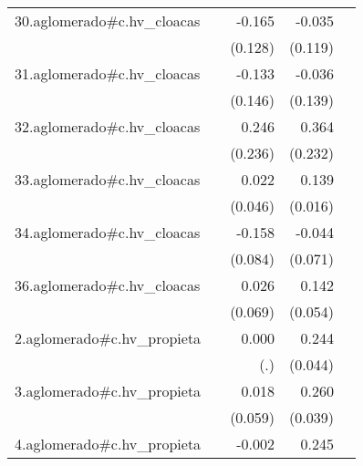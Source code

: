 {\begin{longtable}{l*{4}{D{.}{.}{-1}}}
\addlinespace
30.aglomerado#c.hv\_cloacas&                     &      -0.165         &      -0.035         &                     \\
            &                     &     (0.128)         &     (0.119)         &                     \\
\addlinespace
31.aglomerado#c.hv\_cloacas&                     &      -0.133         &      -0.036         &                     \\
            &                     &     (0.146)         &     (0.139)         &                     \\
\addlinespace
32.aglomerado#c.hv\_cloacas&                     &       0.246         &       0.364         &                     \\
            &                     &     (0.236)         &     (0.232)         &                     \\
\addlinespace
33.aglomerado#c.hv\_cloacas&                     &       0.022         &       0.139\sym{***}&                     \\
            &                     &     (0.046)         &     (0.016)         &                     \\
\addlinespace
34.aglomerado#c.hv\_cloacas&                     &      -0.158         &      -0.044         &                     \\
            &                     &     (0.084)         &     (0.071)         &                     \\
\addlinespace
36.aglomerado#c.hv\_cloacas&                     &       0.026         &       0.142\sym{**} &                     \\
            &                     &     (0.069)         &     (0.054)         &                     \\
\addlinespace
2.aglomerado#c.hv\_propieta&                     &       0.000         &       0.244\sym{***}&                     \\
            &                     &         (.)         &     (0.044)         &                     \\
\addlinespace
3.aglomerado#c.hv\_propieta&                     &       0.018         &       0.260\sym{***}&                     \\
            &                     &     (0.059)         &     (0.039)         &                     \\
\addlinespace
4.aglomerado#c.hv\_propieta&                     &      -0.002         &       0.245\sym{***}&                     \\

\end{longtable}}
